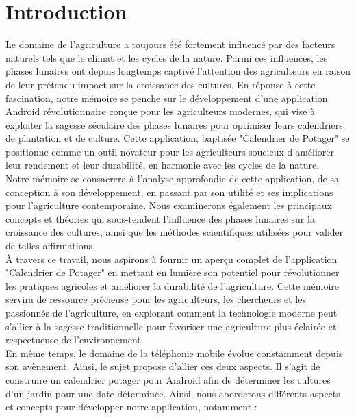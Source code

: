 \chapter*{Introduction}
Le domaine de l'agriculture a toujours été fortement influencé par des facteurs naturels tels que le climat et les cycles de la nature. Parmi ces influences, les phases lunaires ont depuis longtemps captivé l'attention des agriculteurs en raison de leur prétendu impact sur la croissance des cultures. En réponse à cette fascination, notre mémoire se penche sur le développement d'une application Android révolutionnaire conçue pour les agriculteurs modernes, qui vise à exploiter la sagesse séculaire des phases lunaires pour optimiser leurs calendriers de plantation et de culture. Cette application, baptisée "Calendrier de Potager" se positionne comme un outil novateur pour les agriculteurs soucieux d'améliorer leur rendement et leur durabilité, en harmonie avec les cycles de la nature.\\
Notre mémoire se consacrera à l'analyse approfondie de cette application, de sa conception à son développement, en passant par son utilité et ses implications pour l'agriculture contemporaine. Nous examinerons également les principaux concepts et théories qui sous-tendent l'influence des phases lunaires sur la croissance des cultures, ainsi que les méthodes scientifiques utilisées pour valider de telles affirmations. \\
À travers ce travail, nous aspirons à fournir un aperçu complet de l'application "Calendrier de Potager" en mettant en lumière son potentiel pour révolutionner les pratiques agricoles et améliorer la durabilité de l'agriculture. Cette mémoire servira de ressource précieuse pour les agriculteurs, les chercheurs et les passionnés de l'agriculture, en explorant comment la technologie moderne peut s'allier à la sagesse traditionnelle pour favoriser une agriculture plus éclairée et respectueuse de l'environnement. \\
En même temps, le domaine de la téléphonie mobile évolue constamment depuis son avènement. Ainsi, le sujet propose d'allier ces deux aspects. Il s'agit de construire un calendrier potager pour Android afin de déterminer les cultures d'un jardin pour une date déterminée. Ainsi, nous aborderons différents aspects et concepts pour développer notre application, notamment :\\
